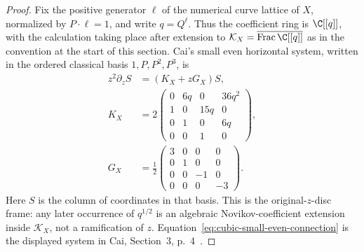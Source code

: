 \begin{proof}
Fix the positive generator \(\ell\) of the numerical curve lattice of \(X\),
normalized by \(P\cdot\ell=1\), and write \(q=Q^\ell\).  Thus the
coefficient ring is \(\C[[q]]\), with the calculation taking place after
extension to \(\mathcal K_X=\overline{\operatorname{Frac}\C[[q]]}\) as in
the convention at the start of this section.  Cai's small even horizontal
system, written in the ordered classical basis \(1,P,P^2,P^3\), is
\[
 \begin{aligned}
 z^2\partial_zS&=(K_X+zG_X)S,\\
 K_X&=2\begin{pmatrix}
 0&6q&0&36q^2\\
 1&0&15q&0\\
 0&1&0&6q\\
 0&0&1&0
 \end{pmatrix},\\
 G_X&=\frac12\begin{pmatrix}
 3&0&0&0\\
 0&1&0&0\\
 0&0&-1&0\\
 0&0&0&-3
 \end{pmatrix}.
 \end{aligned}
 \tag{4.9a}
 \label{eq:cubic-small-even-connection}
\]
Here \(S\) is the column of coordinates in that basis.  This is the
original-\(z\)-disc frame: any later occurrence of \(q^{1/2}\) is an
algebraic Novikov-coefficient extension inside \(\mathcal K_X\), not a
ramification of \(z\).  Equation~\eqref{eq:cubic-small-even-connection} is
the displayed system in Cai, Section~3, p.~4~\cite{Cai}.


\end{proof}
